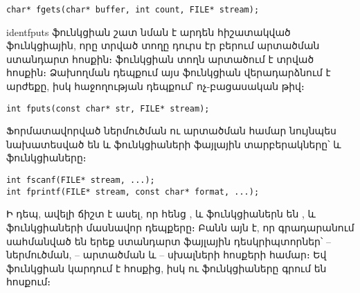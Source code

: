 \begin{Verbatim}
char* fgets(char* buffer, int count, FILE* stream);
\end{Verbatim}

ident{fputs} ֆունկցիան շատ նման է արդեն հիշատակված 
ֆունկցիային, որը տրված տողը դուրս էր բերում արտածման ստանդարտ
հոսքին։  ֆունկցիան  տողն արտածում է տրված
 հոսքին։ Ձախողման դեպքում այս ֆունկցիան վերադարձնում
է  արժեքը, իսկ հաջողության դեպքում՝ ոչ-բացասական թիվ։

\begin{Verbatim}
int fputs(const char* str, FILE* stream);
\end{Verbatim}

Ֆորմատավորված ներմուծման ու արտածման համար նույնպես նախատեսված
են  և  ֆունկցիաների ֆայլային
տարբերակները՝  և  ֆունկցիաները։

\begin{Verbatim}
int fscanf(FILE* stream, ...);
int fprintf(FILE* stream, const char* format, ...);
\end{Verbatim}

Ի դեպ, ավելի ճիշտ է ասել, որ հենց , 
և  ֆունկցիաներն են , 
և  ֆունկցիաների մասնավոր դեպքերը։ Բանն այն է, որ
 գրադարանում սահմանված են երեք ստանդարտ ֆայլային
դեսկրիպտորներ՝  -- ներմուծման,  --
արտածման և  -- սխալների հոսքերի համար։ Եվ
 ֆունկցիան կարդում է  հոսքից, իսկ
 ու  ֆունկցիաները գրում են
 հոսքում։
